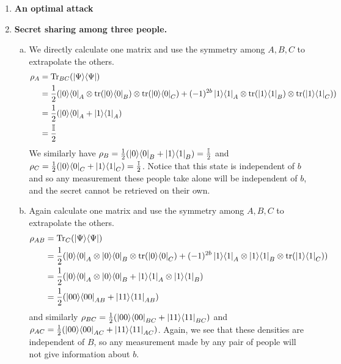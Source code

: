 \documentclass[12pt]{article}
\begin{document}
\begin{enumerate}
		
\item {\bf An optimal attack}\label{ex:opt-wiesner}
 






\item  \textbf{Secret sharing among three people.}
\begin{enumerate}[(a)]
\item We directly calculate one matrix and use the symmetry among $A,B,C$ to extrapolate the others. $$\begin{aligned}\rho_{A} & = \text{Tr}_{BC}(\ketbra{\Psi}\Psi) \\  & = \frac{1}2(\ketbra{0}0_A\otimes\text{tr}(\ketbra{0}0_B)\otimes \text{tr}(\ketbra{0}0_C) + (-1)^{2b} \ketbra{1}1_A\otimes\text{tr}(\ketbra{1}1_B)\otimes \text{tr}(\ketbra{1}1_C)) \\ & = \frac{1}2(\ketbra{0}0_A + \ketbra{1}1_A) \\ & = \frac{\mathbb{I}}2\end{aligned}$$ We similarly have $\rho_B =\frac{1}2(\ket{0}\!\bra{0}_B + \ket{1}\!\bra{1}_B) = \frac{\mathbb{I}}2$ and $\rho_C = \frac{1}2(\ket{0}\!\bra{0}_C + \ket{1}\!\bra{1}_C) = \frac{\mathbb{I}}2$. Notice that this state is independent of $b$ and so any measurement these people take alone will be independent of $b$, and the secret cannot be retrieved on their own. \\ 

\item Again calculate one matrix and use the symmetry among $A,B,C$ to extrapolate the others. $$\begin{aligned}\rho_{AB} & = \text{Tr}_{C}(\ketbra{\Psi}\Psi) \\  & = \frac{1}2(\ketbra{0}0_A\otimes\ketbra{0}0_B\otimes \text{tr}(\ketbra{0}0_C) + (-1)^{2b} \ketbra{1}1_A\otimes\ketbra{1}1_B\otimes \text{tr}(\ketbra{1}1_C)) \\ & = \frac{1}2(\ketbra{0}0_A\otimes \ketbra{0}0_B + \ketbra{1}1_A\otimes \ketbra{1}1_B) \\ & = \frac{1}2(\ketbra{00}{00}_{AB} + \ketbra{11}{11}_{AB})\end{aligned}$$ and similarly $\rho_{BC} = \frac{1}2(\ket{00}\!\bra{00}_{BC} + \ket{11}\!\bra{11}_{BC})$ and $\rho_{AC} = \frac{1}2(\ket{00}\!\bra{00}_{AC} + \ket{11}\!\bra{11}_{AC})$. Again, we see that these densities are independent of $B$, so any measurement made by any pair of people will not give information about $b$.


\end{enumerate}
\end{enumerate}
\end{document}
